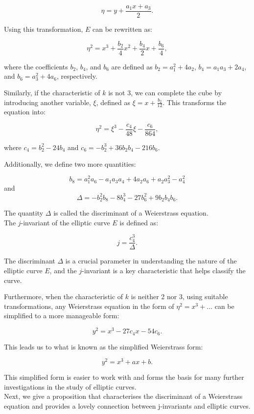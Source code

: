 \[
\eta = y + \frac{a_1 x + a_3}{2}.
\]

Using this transformation, \( E \) can be rewritten as:

\[
\eta^2 = x^3 + \frac{b_2}{4}x^2 + \frac{b_4}{2}x + \frac{b_6}{4},
\]

where the coefficients \( b_2 \), \( b_4 \), and \( b_6 \) are defined as \( b_2 = a_1^2 + 4a_2 \), \( b_4 = a_1a_3 + 2a_4 \), and \( b_6 = a_3^2 + 4a_6 \), respectively.

Similarly, if the characteristic of \( k \) is not 3, we can complete the cube by introducing another variable, \( \xi \), defined as \( \xi = x + \frac{b_2}{12} \). This transforms the equation into:

\[
\eta^2 = \xi^3 - \frac{c_4}{48}\xi - \frac{c_6}{864},
\]

where \( c_4 = b_2^2 - 24b_4 \) and \( c_6 = -b_2^3 + 36b_2b_4 - 216b_6 \).

Additionally, we define two more quantities:

\[
b_8 = a_1^2a_6 - a_1a_3a_4 + 4a_2a_6 + a_2a_3^2 - a_4^2
\]
and
\[
\Delta = -b_2^2b_8 - 8b_4^3 - 27b_6^2 + 9b_2b_4b_6.
\]
\begin{definition}
The quantity  \( \Delta \) is called the discriminant of a Weierstrass equation. \\
The \( j \)-invariant of the elliptic curve \( E \) is defined as:

\[
j = \frac{c_4^3}{\Delta}.
\]    
\end{definition}


The discriminant \( \Delta \) is a crucial parameter in understanding the nature of the elliptic curve \( E \), and the \( j \)-invariant is a key characteristic that helps classify the curve.

Furthermore, when the characteristic of \( k\) is neither 2 nor 3, using suitable transformations, any Weierstrass equation in the form of \( \eta^2 = x^3 + \ldots \) can be simplified to a more manageable form:

\[
y^2 = x^3 - 27c_4x - 54c_6.
\]

This leads us to what is known as the simplified Weierstrass form:

\[
y^2 = x^3 + ax + b.
\]

This simplified form is easier to work with and forms the basis for many further investigations in the study of elliptic curves.\\

Next, we give a proposition that characterises the discriminant of a Weierstrass equation and provides a lovely connection between j-invariants and elliptic curves.


